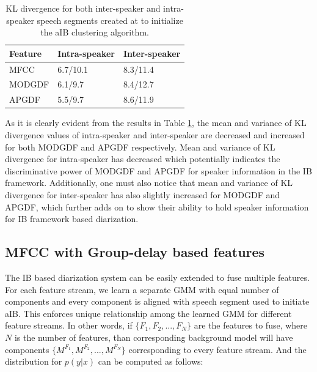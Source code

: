 \documentclass[conference]{IEEEtran}
\begin{document}
\begin{table}[h]
\centering

\label{table:kl-div}
\begin{tabular}{|l|l|l|}
\hline
Feature 			& Intra-speaker 			& Inter-speaker 	 \\ \hline
MFCC          			& 6.7/10.1               & 8.3/11.4       \\ \hline
MODGDF        			& 6.1/9.7                & 8.4/12.7       \\ \hline
APGDF         			& 5.5/9.7                & 8.6/11.9        \\ \hline
\end{tabular}

\vspace{0.4cm}
\caption{KL divergence for both inter-speaker and intra-speaker speech segments created at to initialize the aIB clustering algorithm.}
\end{table}

As it is clearly evident from the results in Table \ref{table:kl-div}, the mean and variance of KL divergence values of intra-speaker and inter-speaker are decreased and increased for both MODGDF and APGDF respectively. Mean and variance of KL divergence for intra-speaker has decreased which potentially indicates the discriminative power of MODGDF and APGDF for speaker information in the IB framework. Additionally, one must also notice that mean and variance of KL divergence for inter-speaker has also slightly increased for MODGDF and APGDF, which further adds on to show their ability to hold speaker information for IB framework based diarization.  

\subsection{MFCC with Group-delay based features}
\label{feature_fusion}
The IB based diarization system can be easily extended to fuse multiple features. For each feature stream, we learn a separate GMM with equal number of components and every component is aligned with speech segment used to initiate aIB. This enforces unique relationship among the learned GMM for different feature streams. In other words, if $\lbrace F_1,F_2,...,F_N \rbrace$ are the features to fuse, where $N$ is the number of features, than corresponding background model will have components $\lbrace M^{F_{1}},M^{F_{2}},...,M^{F_{N}}\rbrace$ corresponding to every feature stream. And the distribution for $p(y|x)$ can be computed as follows:       
\end{document}
